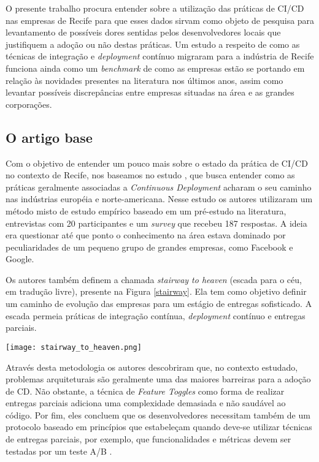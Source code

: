 O presente trabalho procura entender sobre a utilização das práticas de CI/CD nas empresas de Recife para que esses dados sirvam como objeto de pesquisa para levantamento de possíveis dores sentidas pelos desenvolvedores locais que justifiquem a adoção ou não destas práticas. Um estudo a respeito de como as técnicas de integração e \emph{deployment} contínuo migraram para a indústria de Recife funciona ainda como um \emph{benchmark} de como as empresas estão se portando em relação às novidades presentes na literatura nos últimos anos, assim como levantar possíveis discrepâncias entre empresas situadas na área e as grandes corporações. 


\subsection{O artigo base}
Com o objetivo de entender um pouco mais sobre o estado da prática de CI/CD no contexto de Recife, nos baseamos no estudo \cite{empiricalStudy2016}, que busca entender como as práticas geralmente associadas a \emph{Continuous Deployment} acharam o seu caminho nas indústrias européia e norte-americana. Nesse estudo os autores utilizaram um método misto de estudo empírico baseado em um pré-estudo na literatura, entrevistas com 20 participantes e um \emph{survey} que recebeu 187 respostas. A ideia era questionar até que ponto o conhecimento na área estava dominado por peculiaridades de um pequeno grupo de grandes empresas, como Facebook e Google.

Os autores também definem a chamada \emph{stairway to heaven} (escada para o céu, em tradução livre), presente na Figura \ref{stairway}. Ela tem como objetivo definir um caminho de evolução das empresas para um estágio de entregas sofisticado. A escada permeia práticas de integração contínua, \emph{deployment} contínuo e entregas parciais.

\begin{figure*}
\texttt{[image: stairway\_to\_heaven.png]}
\caption[Stairway to Heaven]{
    A escada de evolução denominada \emph{Stairway to Heaven} proposta pelo artigo base.
    Fonte: Schermman et al \cite{empiricalStudy2016}
}\label{stairway}

\end{figure*}

Através desta metodologia os autores descobriram que, no contexto estudado, problemas arquiteturais são geralmente uma das maiores barreiras para a adoção de CD. Não obstante, a técnica de \emph{Feature Toggles} \cite{featureToggles} como forma de realizar entregas parciais adiciona uma complexidade demasiada e não saudável ao código. Por fim, eles concluem que os desenvolvedores necessitam também de um protocolo baseado em princípios que estabeleçam quando deve-se utilizar técnicas de entregas parciais, por exemplo, que funcionalidades e métricas devem ser testadas por um teste A/B \cite{testsAB}.

